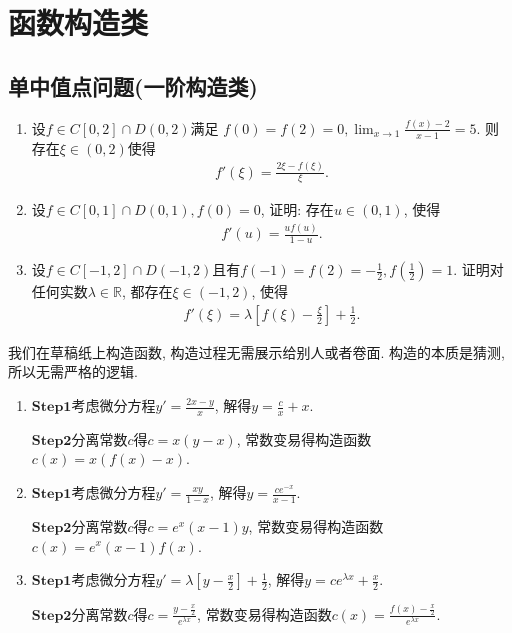 \documentclass[../../main.tex]{subfiles}%
\begin{document}
\section{函数构造类}

\subsection{单中值点问题(一阶构造类)}\label{section单中值点问题}

\begin{example}
\begin{enumerate}
\item 设\(f\in C[0,2]\cap D(0,2)\)满足
\(f(0)=f(2)=0,\lim_{x\rightarrow 1}\frac{f(x)-2}{x - 1}=5\).
则存在\(\xi\in(0,2)\)使得
\begin{align*}
f'(\xi)=\frac{2\xi - f(\xi)}{\xi}.
\end{align*}

\item 设\(f\in C[0,1]\cap D(0,1),f(0)=0\), 证明: 存在\(u\in(0,1)\), 使得
\begin{align*}
f'(u)=\frac{uf(u)}{1 - u}.
\end{align*}

\item 设\(f\in C[-1,2]\cap D(-1,2)\)且有\(f(-1)=f(2)=-\frac{1}{2},f(\frac{1}{2}) = 1\). 证明对任何实数\(\lambda\in\mathbb{R}\), 都存在\(\xi\in(-1,2)\), 使得
\begin{align*}
f'(\xi)=\lambda\left[f(\xi)-\frac{\xi}{2}\right]+\frac{1}{2}.
\end{align*}
\end{enumerate}
\end{example}
\begin{note}
我们在草稿纸上构造函数, 构造过程无需展示给别人或者卷面. 构造的本质是猜测, 所以无需严格的逻辑.
\end{note}
\begin{remark}
\begin{enumerate}
\item $\mathbf{Step}\mathbf{1}$考虑微分方程\(y'=\frac{2x - y}{x}\), 解得\(y=\frac{c}{x}+x\).

$\mathbf{Step}\mathbf{2}$分离常数\(c\)得\(c = x(y - x)\), 常数变易得构造函数\(c(x)=x(f(x)-x)\).

\item $\mathbf{Step}\mathbf{1}$考虑微分方程\(y'=\frac{xy}{1 - x}\), 解得\(y=\frac{ce^{-x}}{x - 1}\).

$\mathbf{Step}\mathbf{2}$分离常数\(c\)得\(c = e^{x}(x - 1)y\), 常数变易得构造函数\(c(x)=e^{x}(x - 1)f(x)\).

\item $\mathbf{Step}\mathbf{1}$考虑微分方程\(y'=\lambda\left[y-\frac{x}{2}\right]+\frac{1}{2}\), 解得\(y = ce^{\lambda x}+\frac{x}{2}\).

$\mathbf{Step}\mathbf{2}$分离常数\(c\)得\(c=\frac{y-\frac{x}{2}}{e^{\lambda x}}\), 常数变易得构造函数\(c(x)=\frac{f(x)-\frac{x}{2}}{e^{\lambda x}}\).
\end{enumerate}
\end{remark}
\end{document}
